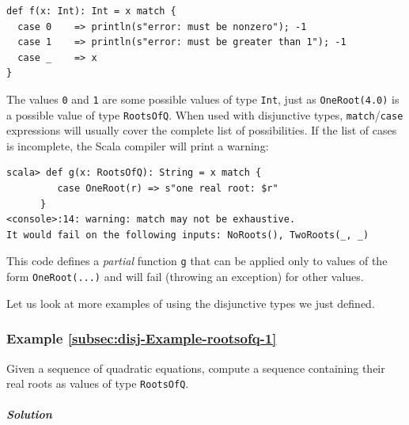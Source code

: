 \begin{lstlisting}
def f(x: Int): Int = x match {
  case 0    => println(s"error: must be nonzero"); -1
  case 1    => println(s"error: must be greater than 1"); -1
  case _    => x
}
\end{lstlisting}
The values \lstinline!0! and \lstinline!1! are some possible values
of type \lstinline!Int!, just as \lstinline!OneRoot(4.0)! is a possible
value of type \lstinline!RootsOfQ!. When used with disjunctive types,
\lstinline!match!/\lstinline!case! expressions will usually cover
the complete list of possibilities. If the list of cases is incomplete,
the Scala compiler will print a warning:
\begin{lstlisting}
scala> def g(x: RootsOfQ): String = x match {
         case OneRoot(r) => s"one real root: $r"
      }
<console>:14: warning: match may not be exhaustive.
It would fail on the following inputs: NoRoots(), TwoRoots(_, _)
\end{lstlisting}
This code defines a \emph{partial} function
\lstinline!g! that can be applied only to values of the form \lstinline!OneRoot(...)!
and will fail (throwing an exception) for other
values.

Let us look at more examples of using the disjunctive types we just
defined.

\subsubsection{Example \label{subsec:disj-Example-rootsofq-1}\ref{subsec:disj-Example-rootsofq-1}}

Given a sequence of quadratic equations, compute a sequence containing
their real roots as values of type \lstinline!RootsOfQ!.

\subparagraph{Solution}

